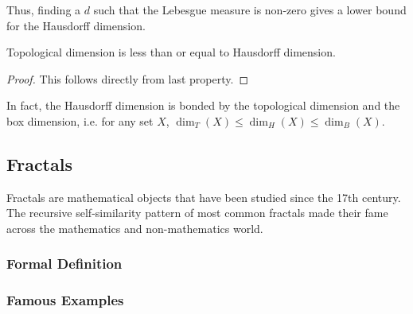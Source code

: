 Thus, finding a $d$ such that the Lebesgue measure is non-zero gives a lower bound for the Hausdorff dimension.

\begin{property}
	Topological dimension is less than or equal to Hausdorff dimension.
\end{property}
\begin{proof}
	This follows directly from last property.
\end{proof}

In fact, the Hausdorff dimension is bonded by the topological dimension and the box dimension, i.e. for any set $X$, $\dim_T(X) \leq \dim_H(X) \leq \dim_B(X)$.

\subsection{Fractals}
Fractals are mathematical objects that have been studied since the 17th century.
The recursive self-similarity pattern of most common fractals made their fame across the mathematics and non-mathematics world.

\subsubsection{Formal Definition}

\subsubsection{Famous Examples}


